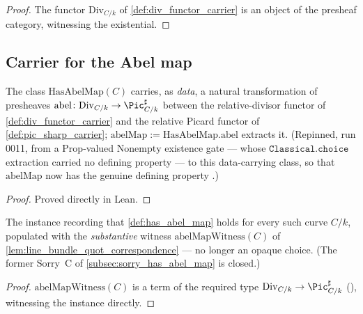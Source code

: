 \begin{proof}\leanok
  The functor \(\mathrm{Div}_{C/k}\) of \cref{def:div_functor_carrier} is an
  object of the presheaf category, witnessing the existential.
\end{proof}

\subsection{Carrier for the Abel map}
\label{subsec:fga_pic_abel_map_carrier}

\begin{definition}
  \label{def:has_abel_map}
  The class \(\mathrm{HasAbelMap}(C)\) carries, as \emph{data}, a natural
  transformation of presheaves \(\mathrm{abel} \colon \mathrm{Div}_{C/k}
  \to \Pic^\sharp_{C/k}\) between the relative-divisor functor of
  \cref{def:div_functor_carrier} and the relative Picard functor of
  \cref{def:pic_sharp_carrier}; \(\mathrm{abelMap} :=
  \mathrm{HasAbelMap.abel}\) extracts it. (Repinned, run 0011, from a
  \(\mathrm{Prop}\)-valued \(\mathrm{Nonempty}\) existence gate --- whose
  \(\mathtt{Classical.choice}\) extraction carried no defining property
  --- to this data-carrying class, so that \(\mathrm{abelMap}\) now has
  the genuine defining property .)
\end{definition}

\begin{proof}
  Proved directly in Lean.
\end{proof}

\begin{definition}
  \label{def:inst_has_abel_map}
  The instance recording that \cref{def:has_abel_map} holds for every such
  curve \(C/k\), populated with the \emph{substantive} witness
  \(\mathrm{abelMapWitness}(C)\) of
  \cref{lem:line_bundle_quot_correspondence} --- no longer an opaque
  choice. (The former Sorry~C of \cref{subsec:sorry_has_abel_map} is
  closed.)
\end{definition}

\begin{proof}
\leanok
  \(\mathrm{abelMapWitness}(C)\) is a term of the required type
  \(\mathrm{Div}_{C/k} \to \Pic^\sharp_{C/k}\)
  (), witnessing the instance
  directly.
\end{proof}

